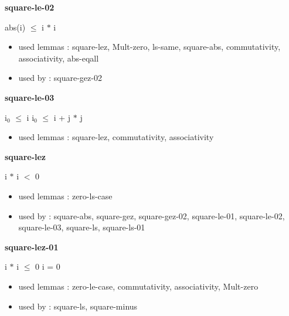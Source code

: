 \documentclass[a4paper]{article}
\begin{document}
\medskip

\bigskip

{\large\bf square-le-02}

\medskip

 \Fol abs(i) $\le$ i $*$ i

\begin{itemize}


\item       used lemmas  : square-lez, Mult-zero, ls-same, square-abs, commutativity, associativity, abs-eqall
\item       used by      : square-gez-02

\end{itemize}

\medskip

\bigskip

{\large\bf square-le-03}

\medskip

 \Fol $\mbox{i}_{0}$ $\le$ i \Imp $\mbox{i}_{0}$ $\le$ i + j $*$ j

\begin{itemize}


\item       used lemmas  : square-lez, commutativity, associativity

\end{itemize}

\medskip

\bigskip

{\large\bf square-lez}

\medskip

 \Fol \Not i $*$ i $<$ 0

\begin{itemize}


\item       used lemmas  : zero-ls-case
\item       used by      : square-abs, square-gez, square-gez-02, square-le-01, square-le-02, square-le-03, square-ls, square-ls-01

\end{itemize}

\medskip

\bigskip

{\large\bf square-lez-01}

\medskip

 \Fol i $*$ i $\le$ 0 \Equiv i = 0

\begin{itemize}


\item       used lemmas  : zero-le-case, commutativity, associativity, Mult-zero
\item       used by      : square-ls, square-minus

\end{itemize}
\end{document}
